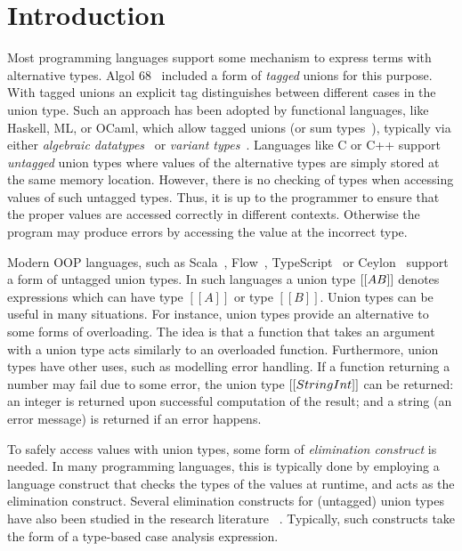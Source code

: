 \section{Introduction}
\label{sec:intro}

Most programming languages support some mechanism to express terms
with alternative types. Algol 68~\cite{van1969report,van2012revised} included a form of
\emph{tagged} unions for this purpose. With tagged unions
an explicit tag distinguishes between different cases in the
union type.
Such an approach has been adopted by functional languages, like Haskell, ML, or
OCaml, which allow tagged unions (or sum types~\cite{cartwright1991soft}), typically via
either \emph{algebraic datatypes}~\cite{hope} or \emph{variant types}~\cite{garrigue98}.
Languages like C or C++ support \emph{untagged} union types where
values of the alternative types are simply stored at the same memory
location. However, there is no checking of types when accessing values of
such untagged types. Thus, it is up to the programmer to ensure that the proper
values are accessed correctly in different contexts. Otherwise the
program may produce errors by accessing the value at the incorrect type.

Modern OOP languages, such as Scala~\cite{odersky2004overview}, Flow~\cite{chaudhuri2015flow},
TypeScript~\cite{bierman2014understanding} or Ceylon~\cite{king2013ceylon} support a form
of untagged union types.
In such languages a union type $[[A \/ B]]$ denotes expressions which can have type
$[[A]]$ or type $[[B]]$. Union types can be useful in many situations.
For instance, union types provide an alternative to some forms
of overloading. The idea is that a function that takes an argument
with a union type acts similarly to an overloaded function.
Furthermore, union types have other uses, such as modelling error handling.
If a function returning a number may fail due to some
error, the union type $[[String \/ Int]]$ can be returned: an integer
is returned upon successful computation of the result; and
a string (an error message) is returned if an error happens.

To safely access values with union types, some form of
\emph{elimination construct} is needed. In many programming languages,
this is typically done by employing a language construct that checks
the types of the values at runtime, and acts as the elimination
construct. Several elimination constructs for (untagged) union types
have also been studied in the research literature~
\cite{benzaken2003cduce,dunfield2014elaborating,castagna:settheoretic}.
Typically, such constructs take the form of a type-based case analysis
expression.


